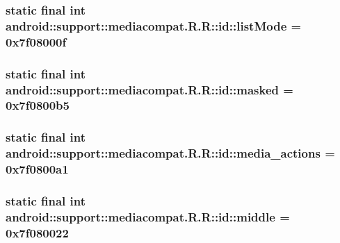 \hypertarget{classandroid_1_1support_1_1mediacompat_1_1_r_1_1id_640eac45f7b1f77f9fc45795704d3dc6}{
\subsubsection[{listMode}]{\setlength{\rightskip}{0pt plus 5cm}static final int android::support::mediacompat.R.R::id::listMode = 0x7f08000f}}
\label{classandroid_1_1support_1_1mediacompat_1_1_r_1_1id_640eac45f7b1f77f9fc45795704d3dc6}


\hypertarget{classandroid_1_1support_1_1mediacompat_1_1_r_1_1id_8649d359cf0dcdff6ebe980adaa73016}{
\subsubsection[{masked}]{\setlength{\rightskip}{0pt plus 5cm}static final int android::support::mediacompat.R.R::id::masked = 0x7f0800b5}}
\label{classandroid_1_1support_1_1mediacompat_1_1_r_1_1id_8649d359cf0dcdff6ebe980adaa73016}


\hypertarget{classandroid_1_1support_1_1mediacompat_1_1_r_1_1id_238768d5d0c83b16e508591abb997719}{
\subsubsection[{media\_\-actions}]{\setlength{\rightskip}{0pt plus 5cm}static final int android::support::mediacompat.R.R::id::media\_\-actions = 0x7f0800a1}}
\label{classandroid_1_1support_1_1mediacompat_1_1_r_1_1id_238768d5d0c83b16e508591abb997719}


\hypertarget{classandroid_1_1support_1_1mediacompat_1_1_r_1_1id_4768c9c34c4004a99cdb3bbfdd3040d8}{
\subsubsection[{middle}]{\setlength{\rightskip}{0pt plus 5cm}static final int android::support::mediacompat.R.R::id::middle = 0x7f080022}}
\label{classandroid_1_1support_1_1mediacompat_1_1_r_1_1id_4768c9c34c4004a99cdb3bbfdd3040d8}


